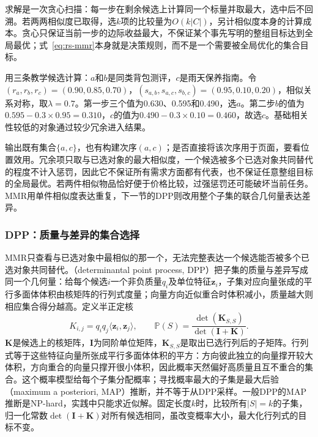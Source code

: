 求解是一次贪心扫描：每一步在剩余候选上计算同一个标量并取最大，选中后不回溯。若两两相似度已取得，选$k$项的比较量为$O(k|C|)$，另计相似度本身的计算成本。贪心只保证当前一步的边际收益最大，不保证某个事先写明的整组目标达到全局最优；式~\eqref{eq:rs-mmr}本身就是决策规则，而不是一个需要被全局优化的集合目标。

用三条教学候选计算：$a$和$b$是同类背包测评，$c$是雨天保养指南。令$(r_a,r_b,r_c)=(0.90,0.85,0.70)$，$(s_{a,b},s_{a,c},s_{b,c})=(0.95,0.10,0.20)$，相似关系对称，取$\lambda=0.7$。第一步三个值为0.630、0.595和0.490，选$a$。第二步$b$的值为$0.595-0.3\times0.95=0.310$，$c$的值为$0.490-0.3\times0.10=0.460$，故选$c$。基础相关性较低的对象通过较少冗余进入结果。

输出既有集合$\{a,c\}$，也有构建次序$(a,c)$；是否直接将该次序用于页面，要看位置效用。冗余项只取与已选对象的最大相似度，一个候选被多个已选对象共同替代的程度不计入惩罚，因此它不保证所有需求方面都有代表，也不保证任意整组目标的全局最优。若两件相似物品恰好便于价格比较，过强惩罚还可能破坏当前任务。MMR用单件相似度表达重复，下一节的DPP则改用整个子集的联合几何量表达差异。

\subsubsection{DPP：质量与差异的集合选择}
\label{sec:rs-dpp}

MMR只查看与已选对象中最相似的那一个，无法完整表达一个候选能否被多个已选对象共同替代。（determinantal point process, DPP）把子集的质量与差异写成同一个几何量：给每个候选$i$一个非负质量$q_i$及单位特征$\bm z_i$，子集对应向量张成的平行多面体体积由核矩阵的行列式度量；向量方向近似重合时体积减小，质量越大则相应集合得分越高。定义半正定核
\begin{equation}
 K_{i,j}=q_iq_j\langle\bm z_i,\bm z_j\rangle,\qquad
 \mathbb P(S)=\frac{\det(\bm K_{S,S})}{\det(\bm I+\bm K)}.
 \label{eq:rs-dpp}
\end{equation}
$\bm K$是候选上的核矩阵，$\bm I$为同阶单位矩阵，$\bm K_{S,S}$是取出已选行列后的子矩阵。行列式等于这些特征向量所张成平行多面体体积的平方：方向彼此独立的向量撑开较大体积，方向重合的向量只撑开很小体积，因此概率天然偏好高质量且互不重合的集合。这个概率模型给每个子集分配概率；寻找概率最大的子集是最大后验（maximum a posteriori, MAP）推断，并不等于从DPP采样。一般DPP的MAP推断是NP-hard，实践中只能求近似解。固定长度$k$时，比较所有$|S|=k$的子集，归一化常数$\det(\bm I+\bm K)$对所有候选相同，虽改变概率大小，最大化行列式的目标不变。

